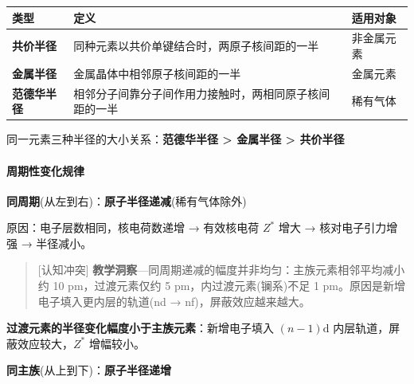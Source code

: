 {\def\LTcaptype{none} %
\begin{longtable}[]{@{}
  >{\raggedright\arraybackslash}p{}
  >{\raggedright\arraybackslash}p{}
  >{\raggedright\arraybackslash}p{}@{}}
\toprule\noalign{}
\begin{minipage}[b]{\linewidth}\raggedright
类型
\end{minipage} & \begin{minipage}[b]{\linewidth}\raggedright
定义
\end{minipage} & \begin{minipage}[b]{\linewidth}\raggedright
适用对象
\end{minipage} \\
\midrule\noalign{}
\endhead
\bottomrule\noalign{}
\endlastfoot
\textbf{共价半径} & 同种元素以共价单键结合时，两原子核间距的一半 & 非金属元素 \\
\textbf{金属半径} & 金属晶体中相邻原子核间距的一半 & 金属元素 \\
\textbf{范德华半径} & 相邻分子间靠分子间作用力接触时，两相同原子核间距的一半 & 稀有气体 \\
\end{longtable}
}

同一元素三种半径的大小关系：\textbf{范德华半径 \textgreater{} 金属半径 \textgreater{} 共价半径}

\paragraph{周期性变化规律}\label{ux5468ux671fux6027ux53d8ux5316ux89c4ux5f8b}

\textbf{同周期}(从左到右)：\textbf{原子半径递减}(稀有气体除外)

原因：电子层数相同，核电荷数递增 → 有效核电荷 \(Z^*\) 增大 → 核对电子引力增强 → 半径减小。

\begin{quote}
{[}认知冲突{]} \textbf{教学洞察}---同周期递减的幅度并非均匀：主族元素相邻平均减小约 10 pm，过渡元素仅约 5 pm，内过渡元素(镧系)不足 1 pm。原因是新增电子填入更内层的轨道(nd → nf)，屏蔽效应越来越大。
\end{quote}

\textbf{过渡元素的半径变化幅度小于主族元素}：新增电子填入 \((n-1)\mathrm{d}\) 内层轨道，屏蔽效应较大，\(Z^*\) 增幅较小。

\textbf{同主族}(从上到下)：\textbf{原子半径递增}

